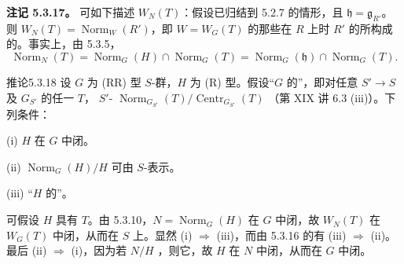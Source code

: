 \textbf{注记 5.3.17。} 可如下描述 $W_N(T)$：假设已归结到 5.2.7 的情形，且 $\mathfrak h=\mathfrak g_{R'}$。则 $W_N(T)=\operatorname{Norm}_W(R')$，即 $W=W_G(T)$ 的那些在 $R$ 上时 $R'$ 的所构成的。事实上，由 5.3.5，
\[\operatorname{Norm}_N(T)=\operatorname{Norm}_G(H)\cap\operatorname{Norm}_G(T)=\operatorname{Norm}_G(\mathfrak h)\cap\operatorname{Norm}_G(T).\]
\begin{SGAresult}{推论}{5.3.18} 设 $G$ 为 (RR) 型 $S$-群，$H$ 为 (R) 型。假设“$G$ 的”，即对任意 $S'\to S$ 及 $G_{S'}$ 的任一 $T$， $S'$- $\operatorname{Norm}_{G_{S'}}(T)/\operatorname{Centr}_{G_{S'}}(T)$ （第 XIX 讲 6.3 (iii)）。下列条件：

(i) $H$ 在 $G$ 中闭。

(ii) $\operatorname{Norm}_G(H)/H$ 可由 $S$-表示。

(iii) “$H$ 的”。
\end{SGAresult}
可假设 $H$ 具有 $T$。由 5.3.10，$N=\operatorname{Norm}_G(H)$ 在 $G$ 中闭，故 $W_N(T)$ 在 $W_G(T)$ 中闭，从而在 $S$ 上。显然 (i) $\Rightarrow$ (iii)，而由 5.3.16 的有 (iii) $\Rightarrow$ (ii)。最后 (ii) $\Rightarrow$ (i)，因为若 $N/H$ ，则它，故 $H$ 在 $N$ 中闭，从而在 $G$ 中闭。

